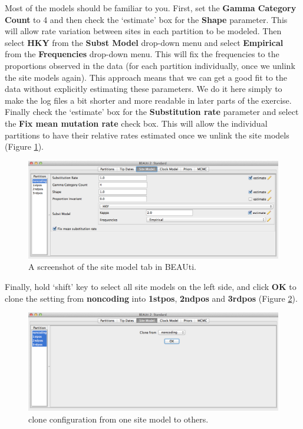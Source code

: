 \documentclass[11pt]{article}
\theoremstyle{plain}%
\theoremstyle{definition}
\theoremstyle{remark}
\begin{document}
Most of the models should be familiar to you. %
First, set the \textbf{Gamma Category Count} to 4 and then check the `estimate' box for the \textbf{Shape} parameter. This will allow rate variation 
between sites in each partition to be modeled.  Then select  \textbf{HKY} from the \textbf{Subst Model} drop-down menu and select \textbf{Empirical} from the \textbf{Frequencies} drop-down menu. This will fix the frequencies to the proportions observed in the data (for each partition individually, once we unlink the site models again). This approach means that we can get a good fit to the data without explicitly estimating these parameters. We do it here simply to make the log files a bit shorter and more readable in later parts of the exercise. Finally check the `estimate' box for the \textbf{Substitution rate} parameter and select the \textbf{Fix mean mutation rate} check box. This will allow the individual partitions to have their relative rates estimated once we unlink the site models (Figure \ref{fig:BEAUti_Model}).

\begin{figure}
\includegraphics[width=\textwidth]{figures/BEAUti_Model}
\caption{A screenshot of the site model tab in BEAUti.}
\label{fig:BEAUti_Model}
\end{figure}

Finally, hold `shift' key to select all site models on the left side, and click \textbf{OK} to clone the setting from \textbf{noncoding} into \textbf{1stpos}, \textbf{2ndpos} and \textbf{3rdpos} (Figure \ref{fig:cloneFrom}). 

\begin{figure}
\includegraphics[width=\textwidth]{figures/cloneFrom}
\caption{clone configuration from one site model to others.}
\label{fig:cloneFrom}
\end{figure}
\end{document}
